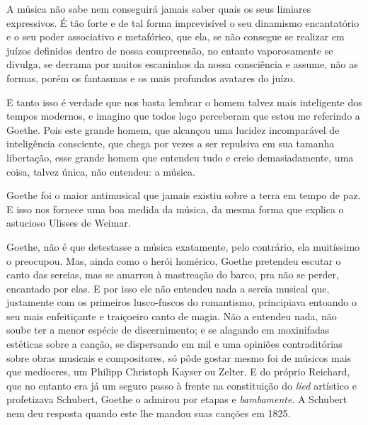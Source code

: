 A música não sabe nem conseguirá jamais saber quais os seus limiares
expressivos. É tão forte e de tal forma imprevisível o seu dinamismo
encantatório e o seu poder associativo e metafórico, que ela, se não
consegue se realizar em juízos definidos dentro de nossa compreensão, no
entanto vaporosamente se divulga, se derrama por muitos escaninhos da
nossa consciência e assume, não as formas, porém os fantasmas e os mais
profundos avatares do juízo.

E tanto isso é verdade que nos basta lembrar o homem talvez mais
inteligente dos tempos modernos, e imagino que todos logo perceberam que
estou me referindo a Goethe. Pois este grande homem, que alcançou uma
lucidez incomparável de inteligência consciente, que chega por vezes a
ser repulsiva em sua tamanha libertação, esse grande homem que entendeu
tudo e creio demasiadamente, uma coisa, talvez única, não entendeu: a
música.

Goethe foi o maior antimusical que jamais existiu sobre a terra em tempo
de paz. E isso nos fornece uma boa medida da música, da mesma forma que
explica o astucioso Ulisses de Weimar.

Goethe, não é que detestasse a música exatamente, pelo contrário, ela
muitíssimo o preocupou. Mas, ainda como o herói homérico, Goethe
pretendeu escutar o canto das sereias, mas se amarrou à mastreação do
barco, pra não se perder, encantado por elas. E por isso ele não
entendeu nada a sereia musical que, justamente com os primeiros
lusco-fuscos do romantismo, principiava entoando o seu mais enfeitiçante
e traiçoeiro canto de magia. Não a entendeu nada, não soube ter a menor
espécie de discernimento; e se alagando em moxinifadas estéticas sobre a
canção, se dispersando em mil e uma opiniões contraditórias sobre obras
musicais e compositores, só pôde gostar mesmo foi de músicos mais que
medíocres, um Philipp Christoph Kayser ou Zelter. E do próprio Reichard,
que no entanto era já um seguro passo à frente na constituição do \textit{lied}
artístico e profetizava Schubert, Goethe o admirou por etapas e
\textit{bambamente}. A Schubert nem deu resposta quando este lhe mandou suas
canções em 1825.

